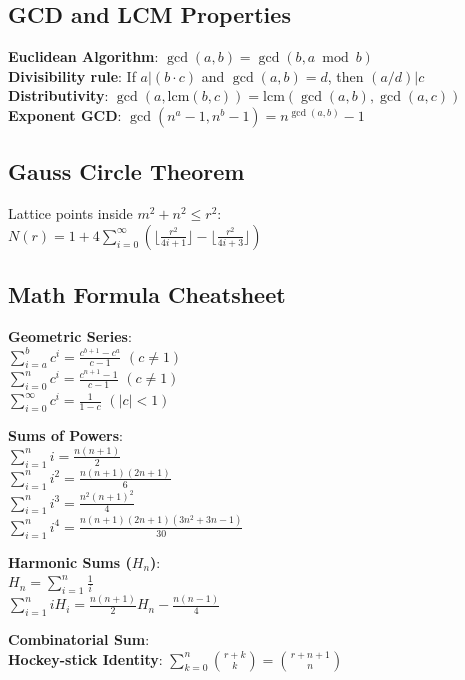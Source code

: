 \subsection{GCD and LCM Properties}
\textbullet{} \textbf{Euclidean Algorithm}: $\gcd(a, b) = \gcd(b, a \bmod b)$ \\
\textbullet{} \textbf{Divisibility rule}: If $a | (b \cdot c)$ and $\gcd(a, b) = d$, then $(a/d) | c$ \\
\textbullet{} \textbf{Distributivity}: $\gcd(a, \text{lcm}(b,c)) = \text{lcm}(\gcd(a,b), \gcd(a,c))$ \\
\textbullet{} \textbf{Exponent GCD}: $\gcd(n^a - 1, n^b - 1) = n^{\gcd(a,b)} - 1$
\subsection{Gauss Circle Theorem}
Lattice points inside $m^2 + n^2 \le r^2$: \\
$N(r) = 1 + 4 \sum_{i=0}^\infty \left( \lfloor \frac{r^2}{4i+1} \rfloor - \lfloor \frac{r^2}{4i+3} \rfloor \right)$
\subsection{Math Formula Cheatsheet}

\textbf{Geometric Series}: \\
\textbullet{} $\sum_{i=a}^b c^i = \frac{c^{b+1} - c^a}{c - 1}$ \quad $(c \neq 1)$ \\
\textbullet{} $\sum_{i=0}^n c^i = \frac{c^{n+1}-1}{c-1}$ \quad $(c \neq 1)$ \\
\textbullet{} $\sum_{i=0}^\infty c^i = \frac{1}{1-c}$ \quad $(|c| < 1)$

\textbf{Sums of Powers}: \\
\textbullet{} $\sum_{i=1}^n i = \frac{n(n+1)}{2}$ \\
\textbullet{} $\sum_{i=1}^n i^2 = \frac{n(n+1)(2n+1)}{6}$ \\
\textbullet{} $\sum_{i=1}^n i^3 = \frac{n^2(n+1)^2}{4}$ \\
\textbullet{} $\sum_{i=1}^n i^4 = \frac{n(n+1)(2n+1)(3n^2+3n-1)}{30}$

\textbf{Harmonic Sums ($H_n$)}: \\
\textbullet{} $H_n = \sum_{i=1}^n \frac{1}{i}$ \\
\textbullet{} $\sum_{i=1}^n i H_i = \frac{n(n+1)}{2} H_n - \frac{n(n-1)}{4}$

\textbf{Combinatorial Sum}: \\
\textbullet{} \textbf{Hockey-stick Identity}: $\sum_{k=0}^n \binom{r+k}{k} = \binom{r+n+1}{n}$
